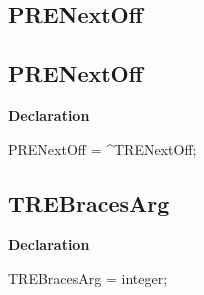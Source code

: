 \documentclass{report}
\newif\ifpdf
\begin{document}
\subsection*{\large{\textbf{PRENextOff}}\normalsize\hspace{1ex}\hrulefill}
\else
\subsection*{PRENextOff}
\fi
\label{RegExpr-PRENextOff}
\begin{list}{}{
\setlength{\itemindent}{0cm}
\setlength{\listparindent}{0cm}
\setlength{\leftmargin}{\evensidemargin}
\addtolength{\leftmargin}{\tmplength}
\settowidth{\labelsep}{X}
\addtolength{\leftmargin}{\labelsep}
\setlength{\labelwidth}{\tmplength}
}
\item[\textbf{Declaration}\hfill]
\ifpdf
\begin{flushleft}
\fi
\begin{ttfamily}
PRENextOff = {\^{}}TRENextOff;\end{ttfamily}

\ifpdf
\end{flushleft}
\fi

\end{list}
\ifpdf
\subsection*{\large{\textbf{TREBracesArg}}\normalsize\hspace{1ex}\hrulefill}
\else
\subsection*{TREBracesArg}
\fi
\label{RegExpr-TREBracesArg}
\begin{list}{}{
\setlength{\itemindent}{0cm}
\setlength{\listparindent}{0cm}
\setlength{\leftmargin}{\evensidemargin}
\addtolength{\leftmargin}{\tmplength}
\settowidth{\labelsep}{X}
\addtolength{\leftmargin}{\labelsep}
\setlength{\labelwidth}{\tmplength}
}
\item[\textbf{Declaration}\hfill]
\ifpdf
\begin{flushleft}
\fi
\begin{ttfamily}
TREBracesArg = integer;\end{ttfamily}

\ifpdf
\end{flushleft}
\fi

\end{list}
\ifpdf
\end{document}
